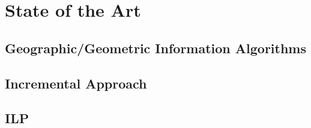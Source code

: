 \chapter{State of the Art}
\label{chap:sota}
\section{Geographic/Geometric Information Algorithms}
\section{Incremental Approach}
\section{ILP}